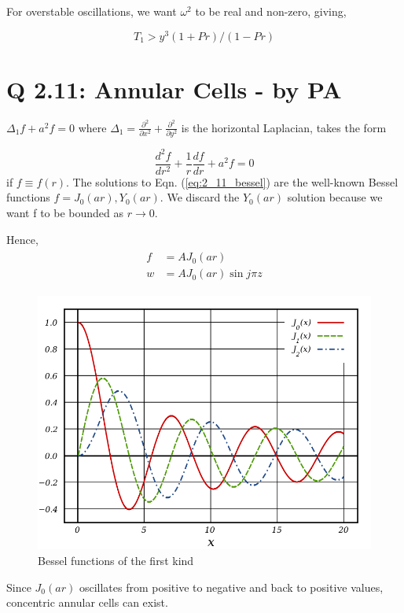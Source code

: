 For overstable oscillations, we want $\omega^{2}$ to be real and non-zero, giving, 

\begin{equation}\label{eq:2_10_overstability_cond}
 \boxed{
 T_{1} > y^{3} (1+Pr)/(1-Pr)
 }
\end{equation}
\section{Q 2.11: Annular Cells - by PA}
$\Delta_{1} f + a^{2}f = 0$ where $\Delta_{1} = \frac{\partial^{2}}{\partial x^{2}} + \frac{\partial^{2}}{\partial y^{2}}$ is the horizontal Laplacian, takes the form 

\begin{equation}\label{eq:2_11_bessel}
 \frac{d^{2}f}{dr^{2}} + \frac{1}{r}\frac{df}{dr} + a^{2}f = 0
\end{equation}
if $f \equiv f(r)$. The solutions to Eqn. (\ref{eq:2_11_bessel}) are the well-known Bessel functions $f = J_{0}(ar), Y_{0}(ar)$. We discard the $Y_{0}(ar)$ solution because we want f to be bounded as $r \rightarrow 0$. 

Hence,
\begin{align}
 \begin{split}
  f &= AJ_{0}(ar)\\
  w &= A J_{0}(ar) \sin{j\pi z}
 \end{split}
\end{align}

 \begin{figure}[H]
    \centering
    \includegraphics[scale = 0.5]{Figs/Bessel_Functions.png}
    \caption{Bessel functions of the first kind}
    \label{fig:Bessel_Functions}
\end{figure}

Since $J_{0}(ar)$ oscillates from positive to negative and back to positive values, concentric annular cells can exist. 
